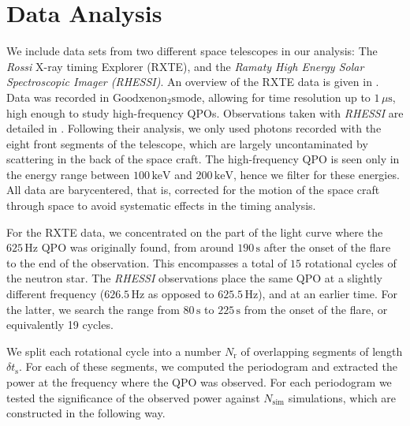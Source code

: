 \documentclass{emulateapj}
\begin{document}
\section{Data Analysis}
\label{sec:analysis}

We include data sets from two different space telescopes in our analysis: The {\it Rossi} X-ray timing Explorer (RXTE), and the {\it Ramaty High Energy Solar Spectroscopic Imager (RHESSI)}. An overview of the RXTE data is given in \citep{Israel05}. Data was recorded in $\mathrm{Goodxenon_2s mode}$, allowing for time resolution up to $1 \, \mu \mathrm{s}$, high enough to study high-frequency QPOs.
Observations taken with {\it RHESSI} are detailed in \citep{Watts06}. Following their analysis, we only used photons recorded with the eight front segments of the telescope, which are largely uncontaminated by scattering in the back of the space craft. The high-frequency QPO is seen only in the energy range between $100 \, \mathrm{keV}$ and $200 \, \mathrm{keV}$, hence we filter for these energies. All data are barycentered, that is, corrected for the motion of the space craft through space to avoid systematic effects in the timing analysis.

For the RXTE data, we concentrated on the part of the light curve where the $625 \, \mathrm{Hz}$ QPO was originally found, from around $190\, \mathrm{s}$ after the onset of the flare to the end of the observation. This encompasses a total of $15$ rotational cycles of the neutron star. The {\it RHESSI} observations place the same QPO at a slightly different frequency ($626.5 \, \mathrm{Hz}$ as opposed to $625.5 \, \mathrm{Hz}$), and at an earlier time. For the latter, we search the range from $80\, \mathrm{s}$ to $225 \, \mathrm{s}$ from the onset of the flare, or equivalently 19 cycles.

We split each rotational cycle into a number $N_\mathrm{r}$ of overlapping segments of length $\delta t_{\mathrm{s}}$. For each of these segments, we computed the periodogram and extracted the power at the frequency where the QPO was observed. For each periodogram we tested the significance of the observed power against $N_{\mathrm{sim}}$ simulations, which are constructed in the following way.
\end{document}
